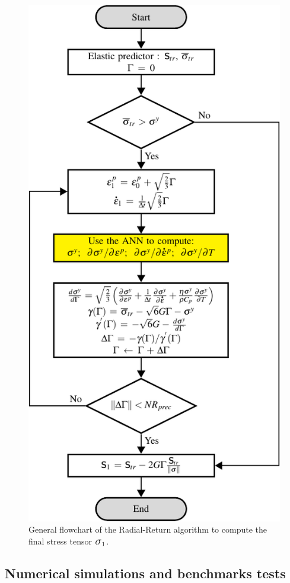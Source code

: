 \documentclass[algorithms,article,submit,pdftex,moreauthors]{Definitions/mdpi}
\DeclareRobustCommand{\Sig}{\mbox{\Large\ensuremath{\sigma}}}
\begin{document}
\begin{figure}[!ht]
\centering
\includegraphics[width=0.6\columnwidth]{Figures/VumatGeneralNewtonRaphson}
\caption{General flowchart of the Radial-Return algorithm to compute the final stress tensor $\Sig_1$.}
\label{fig:RadialReturn}
\end{figure}

\subsection{Numerical simulations and benchmarks tests}\label{sec:Simulations}
\end{document}
